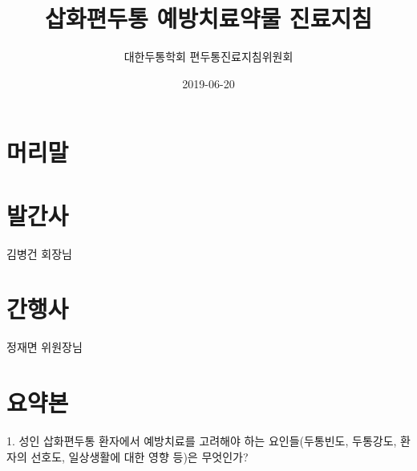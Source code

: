 \documentclass[]{book}
\title{삽화편두통 예방치료약물 진료지침}
\author{대한두통학회 편두통진료지침위원회}
\date{2019-06-20}
\begin{document}
\maketitle

{
\setcounter{tocdepth}{1}
\tableofcontents
}
\frontmatter

\hypertarget{section}{%
\chapter*{머리말}\label{section}}

\hypertarget{section-1}{%
\chapter*{발간사}\label{section-1}}

김병건 회장님

\hypertarget{section-2}{%
\chapter*{간행사}\label{section-2}}

정재면 위원장님

\mainmatter

\hypertarget{section-3}{%
\chapter{요약본}\label{section-3}}

1. 성인 삽화편두통 환자에서 예방치료를 고려해야 하는 요인들(두통빈도, 두통강도, 환자의 선호도, 일상생활에 대한 영향 등)은 무엇인가?
\end{document}
